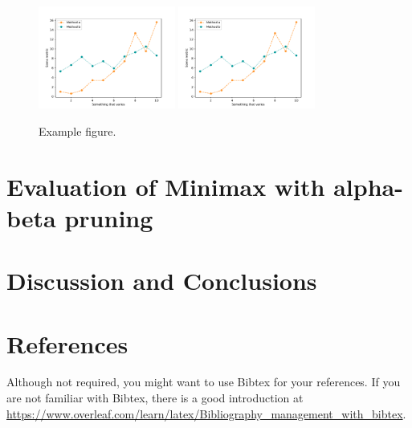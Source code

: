 \documentclass[11pt]{article}
\begin{document}
\begin{figure}[!ht]
\centering
\caption{Example figure.}
\includegraphics[width=0.4\textwidth]{figure_example.pdf}
\includegraphics[width=0.4\textwidth]{figure_example.pdf}
\label{figure:example}
\end{figure}

\section{Evaluation of Minimax with alpha-beta pruning}

\section{Discussion and Conclusions}

\section{References}

Although not required, you might want to use Bibtex for your references. If you are not familiar with Bibtex, there is a good introduction at \url{https://www.overleaf.com/learn/latex/Bibliography_management_with_bibtex}.
\end{document}
